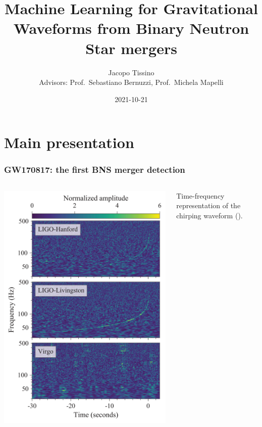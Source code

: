 \documentclass{beamer}
\title{Machine Learning for Gravitational Waveforms from Binary Neutron Star mergers}
\author{Jacopo Tissino \\ Advisors: Prof.\ Sebastiano Bernuzzi, Prof.\ Michela Mapelli}
\date{2021-10-21}
\begin{document}
\frame{\titlepage}

\section{Main presentation}

\begin{frame}
    \frametitle{GW170817: the first BNS merger detection}
    \begin{columns}
        
    \begin{column}{0.5\textwidth}
    \includegraphics[width=\textwidth]{figures/836px-GW170817_spectrograms.svg.png}
    \end{column}

    \begin{column}{0.5\textwidth}
    Time-frequency representation of the chirping waveform
    (\cite[]{abbottGW170817ObservationGravitational2017}).

    \end{column}
    \end{columns}
\end{frame}
\end{document}
